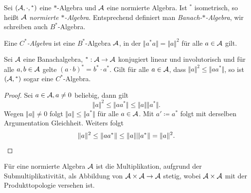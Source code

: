 \begin{definition}
    Sei $(\mathcal{A}, \cdot, {}^*)$ eine $\ast$-Algebra und $\mathcal{A}$ eine normierte Algebra. Ist ${}^*$ isometrisch, so heißt $\mathcal{A}$ \emph{normierte $*$-Algebra}. Entsprechend definiert man \emph{Banach-$*$-Algebra}, wir schreiben auch $B^*$-Algebra.
\end{definition}

\begin{definition}
    Eine \emph{$C^*$-Algebra} ist eine $B^*$-Algebra $\mathcal{A}$, in der $\Vert a^* a \Vert = \Vert a \Vert^2$ für alle $a \in \mathcal{A}$ gilt.
\end{definition}

\begin{lemma}
    Sei $\mathcal{A}$ eine Banachalgebra, ${}^* : \mathcal{A} \to \mathcal{A}$ konjugiert linear und involutorisch und für alle $a, b \in \mathcal{A}$ gelte $(a \cdot b)^* = b^* \cdot a^*$. Gilt für alle $a \in \mathcal{A}$, dass $\Vert a \Vert^2 \leq \Vert a a^* \Vert$, so ist $(\mathcal{A}, {}^*)$ sogar eine $C^*$-Algebra.
\end{lemma}

\begin{proof}
    Sei $a \in \mathcal{A}, a \neq 0$ beliebig, dann gilt
    $$ \Vert a \Vert^2 \leq \Vert a a^* \Vert \leq \Vert a \Vert \Vert a^* \Vert. $$
    Wegen $\Vert a \Vert \neq 0$ folgt $ \Vert a \Vert \leq \Vert a^* \Vert $ für alle $a \in \mathcal{A}$. Mit $a' \coloneqq a^*$ folgt mit derselben Argumentation Gleichheit. Weiters folgt
    \begin{equation*}
        \Vert a \Vert^2 \leq \Vert a a^* \Vert \leq \Vert a \Vert \Vert a^* \Vert = \Vert a \Vert^2. \qedhere
    \end{equation*}
\end{proof}

\begin{remark}
    Für eine normierte Algebra $\mathcal{A}$ ist die Multiplikation, aufgrund der Submultiplikativität, als Abbildung von $\mathcal{A} \times \mathcal{A} \to \mathcal{A}$ stetig, wobei $\mathcal{A} \times \mathcal{A}$ mit der Produkttopologie versehen ist.
\end{remark}


